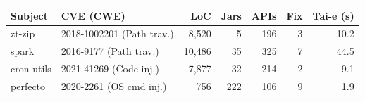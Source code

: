 \begin{tabular}{@{}llrrrrr@{}}
\toprule
Subject & CVE (CWE) & LoC & Jars & APIs & Fix & Tai-e (s) \\
\midrule
zt-zip & 2018-1002201 (Path trav.) & 8,520 & 5 & 196 & 3 & 10.2 \\
spark & 2016-9177 (Path trav.) & 10,486 & 35 & 325 & 7 & 44.5 \\
cron-utils & 2021-41269 (Code inj.) & 7,877 & 32 & 214 & 2 & 9.1 \\
perfecto & 2020-2261 (OS cmd inj.) & 756 & 222 & 106 & 9 & 1.9 \\
\bottomrule
\end{tabular}
